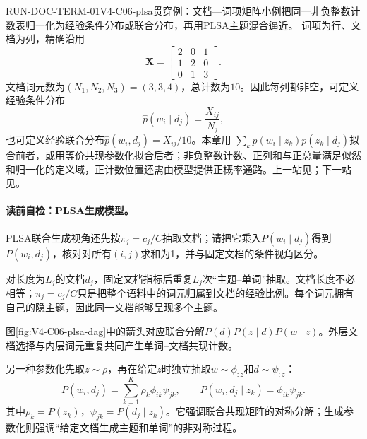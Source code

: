 \begin{SLRunningExample}{RUN-DOC-TERM-01}{V4-C06-plsa}{贯穿例：文档—词项矩阵小例}{把同一非负整数计数表归一化为经验条件分布或联合分布，再用PLSA主题混合逼近。}
词项为行、文档为列，精确沿用
\[
\boldsymbol X=\begin{bmatrix}2&0&1\\1&2&0\\0&1&3\end{bmatrix}.
\]
文档词元数为$(N_1,N_2,N_3)=(3,3,4)$，总计数为$10$。因此每列都非空，可定义经验条件分布
\[
\widehat p(w_i\mid d_j)=\frac{X_{ij}}{N_j},
\]
也可定义经验联合分布$\widehat p(w_i,d_j)=X_{ij}/10$。本章用
$\sum_k p(w_i\mid z_k)p(z_k\mid d_j)$拟合前者，或用等价共现参数化拟合后者；非负整数计数、正列和与正总量满足似然和归一化的定义域，正计数位置还需由模型提供正概率通路。上一站见；下一站见。
\end{SLRunningExample}

\paragraph{读前自检：PLSA生成模型。}PLSA联合生成视角还先按$\pi_j=c_j/C$抽取文档；请把它乘入$P(w_i\mid d_j)$得到$P(w_i,d_j)$，核对对所有$(i,j)$求和为1，并与固定文档的条件视角区分。\par

对长度为$L_j$的文档$d_j$，固定文档指标后重复$L_j$次“主题--单词”抽取。文档长度不必相等；$\pi_j=c_j/C$只是把整个语料中的词元归属到文档的经验比例。每个词元拥有自己的隐主题，因此同一文档能够呈现多个主题。


图\ref{fig:V4-C06-plsa-dag}中的箭头对应联合分解$P(d)P(z\mid d)P(w\mid z)$。外层文档选择与内层词元重复共同产生单词--文档共现计数。

另一种参数化先取$z\sim\rho$，再在给定$z$时独立抽取$w\sim\phi_{:z}$和$d\sim\psi_{:z}$：
\[
P(w_i,d_j)=\sum_{k=1}^K\rho_k\phi_{ik}\psi_{jk},\qquad
P(w_i,d_j\mid z_k)=\phi_{ik}\psi_{jk}.
\]
其中$\rho_k=P(z_k)$，$\psi_{jk}=P(d_j\mid z_k)$。它强调联合共现矩阵的对称分解；生成参数化则强调“给定文档生成主题和单词”的非对称过程。

